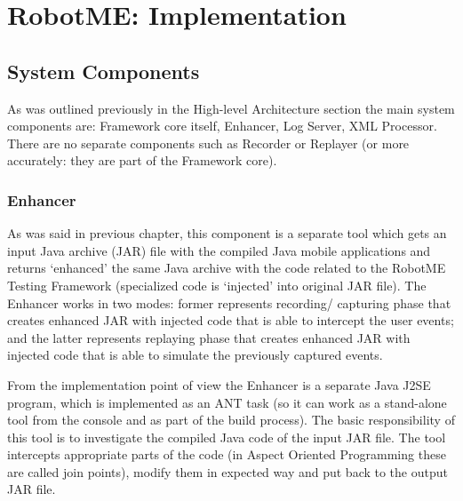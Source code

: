 
\chapter{RobotME: Implementation}

\section{System Components}

As was outlined previously in the High-level Architecture section the main system components are:
Framework core itself, Enhancer, Log Server, XML Processor. There are no
separate components such as Recorder or Replayer (or more accurately: they are part of the
Framework core).

\subsection{Enhancer}
As was said in previous chapter, this component is a separate tool which gets an input Java archive (JAR) file
with the compiled Java mobile applications and returns `enhanced' the same Java archive
with the code related to the RobotME Testing Framework (specialized code is `injected' into original
JAR file). The Enhancer works in two modes: former represents recording/ capturing phase that creates
enhanced JAR with injected code that is able to intercept the user events;
and the latter represents replaying phase that creates enhanced JAR with injected code that
is able to simulate the previously captured events.

From the implementation point of view the Enhancer is a separate Java J2SE program, which is implemented as an ANT
task (so it can work as a stand-alone tool from the console and as part of the build process). The basic responsibility
of this tool is to investigate the compiled Java code of the input JAR file. The tool intercepts appropriate
parts of the code (in Aspect Oriented Programming these are called join points), modify them in expected way
and put back to the output JAR file.

